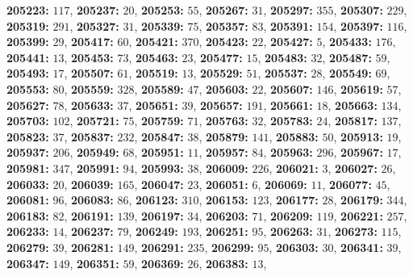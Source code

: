 \textsf{\bfseries 205223:} $117$, \textsf{\bfseries 205237:} $20$, \textsf{\bfseries 205253:} $55$, \textsf{\bfseries 205267:} $31$, \textsf{\bfseries 205297:} $355$, \textsf{\bfseries 205307:} $229$, \textsf{\bfseries 205319:} $291$, \textsf{\bfseries 205327:} $31$, \textsf{\bfseries 205339:} $75$, \textsf{\bfseries 205357:} $83$, \textsf{\bfseries 205391:} $154$, \textsf{\bfseries 205397:} $116$, \textsf{\bfseries 205399:} $29$, \textsf{\bfseries 205417:} $60$, \textsf{\bfseries 205421:} $370$, \textsf{\bfseries 205423:} $22$, \textsf{\bfseries 205427:} $5$, \textsf{\bfseries 205433:} $176$, \textsf{\bfseries 205441:} $13$, \textsf{\bfseries 205453:} $73$, \textsf{\bfseries 205463:} $23$, \textsf{\bfseries 205477:} $15$, \textsf{\bfseries 205483:} $32$, \textsf{\bfseries 205487:} $59$, \textsf{\bfseries 205493:} $17$, \textsf{\bfseries 205507:} $61$, \textsf{\bfseries 205519:} $13$, \textsf{\bfseries 205529:} $51$, \textsf{\bfseries 205537:} $28$, \textsf{\bfseries 205549:} $69$, \textsf{\bfseries 205553:} $80$, \textsf{\bfseries 205559:} $328$, \textsf{\bfseries 205589:} $47$, \textsf{\bfseries 205603:} $22$, \textsf{\bfseries 205607:} $146$, \textsf{\bfseries 205619:} $57$, \textsf{\bfseries 205627:} $78$, \textsf{\bfseries 205633:} $37$, \textsf{\bfseries 205651:} $39$, \textsf{\bfseries 205657:} $191$, \textsf{\bfseries 205661:} $18$, \textsf{\bfseries 205663:} $134$, \textsf{\bfseries 205703:} $102$, \textsf{\bfseries 205721:} $75$, \textsf{\bfseries 205759:} $71$, \textsf{\bfseries 205763:} $32$, \textsf{\bfseries 205783:} $24$, \textsf{\bfseries 205817:} $137$, \textsf{\bfseries 205823:} $37$, \textsf{\bfseries 205837:} $232$, \textsf{\bfseries 205847:} $38$, \textsf{\bfseries 205879:} $141$, \textsf{\bfseries 205883:} $50$, \textsf{\bfseries 205913:} $19$, \textsf{\bfseries 205937:} $206$, \textsf{\bfseries 205949:} $68$, \textsf{\bfseries 205951:} $11$, \textsf{\bfseries 205957:} $84$, \textsf{\bfseries 205963:} $296$, \textsf{\bfseries 205967:} $17$, \textsf{\bfseries 205981:} $347$, \textsf{\bfseries 205991:} $94$, \textsf{\bfseries 205993:} $38$, \textsf{\bfseries 206009:} $226$, \textsf{\bfseries 206021:} $3$, \textsf{\bfseries 206027:} $26$, \textsf{\bfseries 206033:} $20$, \textsf{\bfseries 206039:} $165$, \textsf{\bfseries 206047:} $23$, \textsf{\bfseries 206051:} $6$, \textsf{\bfseries 206069:} $11$, \textsf{\bfseries 206077:} $45$, \textsf{\bfseries 206081:} $96$, \textsf{\bfseries 206083:} $86$, \textsf{\bfseries 206123:} $310$, \textsf{\bfseries 206153:} $123$, \textsf{\bfseries 206177:} $28$, \textsf{\bfseries 206179:} $344$, \textsf{\bfseries 206183:} $82$, \textsf{\bfseries 206191:} $139$, \textsf{\bfseries 206197:} $34$, \textsf{\bfseries 206203:} $71$, \textsf{\bfseries 206209:} $119$, \textsf{\bfseries 206221:} $257$, \textsf{\bfseries 206233:} $14$, \textsf{\bfseries 206237:} $79$, \textsf{\bfseries 206249:} $193$, \textsf{\bfseries 206251:} $95$, \textsf{\bfseries 206263:} $31$, \textsf{\bfseries 206273:} $115$, \textsf{\bfseries 206279:} $39$, \textsf{\bfseries 206281:} $149$, \textsf{\bfseries 206291:} $235$, \textsf{\bfseries 206299:} $95$, \textsf{\bfseries 206303:} $30$, \textsf{\bfseries 206341:} $39$, \textsf{\bfseries 206347:} $149$, \textsf{\bfseries 206351:} $59$, \textsf{\bfseries 206369:} $26$, \textsf{\bfseries 206383:} $13$, 
